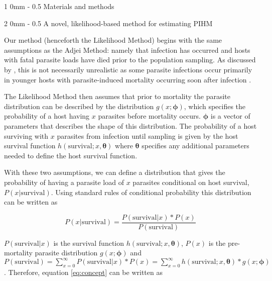\documentclass[12pt, a4paper]{article}
\makeatletter
\renewcommand{\section}{\@startsection
{section}%
{1}%
{0mm}%
{-\baselineskip}%
{0.5\baselineskip}%
{\normalfont\bf\large}} %
\renewcommand{\subsection}{\@startsection
{subsection}%
{2}%
{0mm}%
{-\baselineskip}%
{0.5\baselineskip}%
{\normalfont\bf}} %
\makeatother
\begin{document}
\section{Materials and methods}

\subsection{A novel, likelihood-based method for estimating PIHM}

Our method (henceforth the Likelihood Method) begins with the same assumptions as the Adjei Method: namely that infection has occurred and hosts with fatal parasite loads have died prior to the population sampling. As discussed by
\citeauthor{Adjei1986}, this is not necessarily unrealistic as some parasite infections occur primarily in younger hosts with parasite-induced mortality occurring soon after infection \citep[e.g.][]{Schotthoefer2003,Johnson2008}.

The Likelihood Method then assumes that prior to mortality the parasite distribution can be described by the distribution $g(x; \boldsymbol{\phi})$, which specifies the probability of a host having $x$ parasites before mortality occurs.  $\boldsymbol{\phi}$ is a vector of parameters that describes the shape of this distribution. The probability of a host surviving with $x$ parasites from infection until sampling is given by the host survival function $h(\text{survival} ; x, \boldsymbol{\theta})$ where $\boldsymbol{\theta}$ specifies any additional parameters needed to define the host survival function.

With these two assumptions, we can define a distribution that gives the probability of having a parasite load of $x$ parasites conditional on host survival, $P(x | \text{survival})$.  Using standard rules of conditional probability this distribution can be written as

\begin{equation}
    P(x | \text{survival}) = \dfrac{P(\text{survival} | x) * P(x)}{P(\text{survival})}
    \label{eq:concept}
\end{equation}

$P(\text{survival} | x)$ is the survival function $h(\text{survival}; x, \boldsymbol{\theta})$, $P(x)$ is the pre-mortality parasite distribution $g(x; \boldsymbol{\phi})$ and $P(\text{survival}) = \sum_{x=0}^{\infty} P(\text{survival} | x) * P(x) =  \sum_{x=0}^{\infty} h(\text{survival}; x, \boldsymbol{\theta})  * g(x; \boldsymbol{\phi})$. Therefore, equation \ref{eq:concept} can be written as
\end{document}
